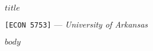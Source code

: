 \documentclass[12pt]{article}
\begin{document}
\begin{center}
  {\Huge\bf $title$}
  
  \smallskip
  {\large\texttt{[ECON 5753]} — \textit{University of Arkansas}}

\end{center}

$body$
\end{document}
